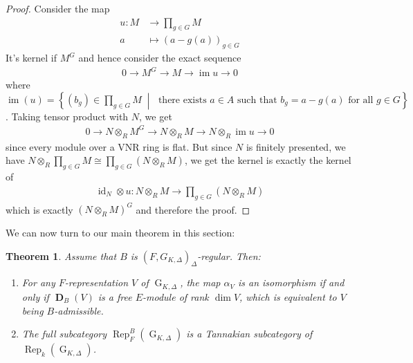 \documentclass{amsart}
\newtheorem{theorem}[proposition]{Theorem}
\DeclareMathOperator{\id}{id}
\DeclareMathOperator{\im}{im}
\DeclareMathOperator{\G}{G}
\DeclareMathOperator{\Rep}{Rep}
\DeclareMathOperator{\bD}{\textbf{D}}
\begin{document}
\begin{proof}
    Consider the map
    \begin{align*}
       u: M&\to \prod\limits_{g\in G}M\\
        a&\mapsto (a-g(a))_{g\in G}
    \end{align*}
    It's kernel if $M^G$ and hence consider the exact sequence
    \begin{align*}
        0\to M^G\to M\to\im u\to 0 
    \end{align*}
    where $\im(u)=\left\{(b_g)\in\prod\limits_{g\in G}M\;\middle|\; \text{ there exists }a\in A\text{ such that }b_g=a-g(a)\text{ for all }g\in G\right\}$. Taking tensor product with $N$, we get
    \begin{align*}
        0\to N\otimes_R M^G\to N\otimes_R M\to N\otimes_R\im u\to 0
    \end{align*}
    since every module over a VNR ring is flat. But since $N$ is finitely presented, we have $N\otimes_R\prod\limits_{g\in G}M\cong \prod\limits_{g\in G}(N\otimes_R M)$, we get the kernel is exactly the kernel of
    \begin{align*}
        \id_N\otimes u: N\otimes_R M\to \prod\limits_{g\in G}(N\otimes_R M)
    \end{align*}
    which is exactly $(N\otimes_R M)^G$ and therefore the proof.
\end{proof}

We can now turn to our main theorem in this section:

\begin{theorem}
    Assume that $B$ is $(F,G_{K,\Delta})_\Delta$-regular. Then:
    \begin{enumerate}
        \item[(i)] For any $F$-representation $V$ of $\G_{K,\Delta}$, the map $\alpha_V$ is an isomorphism if and only if $\bD_B(V)$ is a free $E$-module of rank $\dim V$, which is equivalent to $V$ being $B$-admissible.
        \item[(ii)] The full subcategory $\Rep^B_F(\G_{K,\Delta})$ is a Tannakian subcategory of $\Rep_k(\G_{K,\Delta})$.
    \end{enumerate}
\end{theorem}
\end{document}
